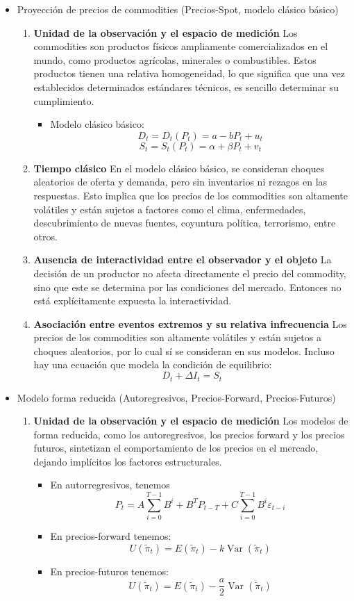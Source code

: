 \begin{problema}
\begin{sol}
\begin{itemize}
\item Proyección de precios de commodities (Precios-Spot, modelo clásico básico) 
\begin{enumerate}
\item \textbf{Unidad de la observación y el espacio de medición}
Los commodities son productos físicos ampliamente comercializados en el mundo, como productos agrícolas, minerales o combustibles. Estos productos tienen una relativa homogeneidad, lo que significa que una vez establecidos determinados estándares técnicos, es sencillo determinar su cumplimiento.
\begin{itemize}
    \item Modelo clásico básico:
    $$D_t=D_t(P_t)=a-bP_t+u_t$$
    $$S_t=S_t(P_t)=\alpha +\beta P_t +v_t$$
\end{itemize}
\item \textbf{Tiempo clásico}
En el modelo clásico básico, se consideran choques aleatorios de oferta y demanda, pero sin inventarios ni rezagos en las respuestas. Esto implica que los precios de los commodities son altamente volátiles y están sujetos a factores como el clima, enfermedades, descubrimiento de nuevas fuentes, coyuntura política, terrorismo, entre otros. 
\item \textbf{Ausencia de interactividad entre el observador y el objeto}
La decisión de un productor no afecta directamente el precio del commodity, sino que este se determina por las condiciones del mercado. Entonces no está explícitamente expuesta la interactividad. 
\item \textbf{Asociación entre eventos extremos y su relativa infrecuencia}
Los precios de los commodities son altamente volátiles y están sujetos a choques aleatorios, por lo cual sí se consideran en sus modelos. Incluso hay una ecuación que modela la condición de equilibrio: 
$$D_t+\Delta I_t=S_t$$
\end{enumerate}


\item Modelo forma reducida (Autoregresivos, Precios-Forward, Precios-Futuros)
\begin{enumerate}
\item \textbf{Unidad de la observación y el espacio de medición}
Los modelos de forma reducida, como los autoregresivos, los precios forward y los precios futuros, sintetizan el comportamiento de los precios en el mercado, dejando implícitos los factores estructurales.
\begin{itemize}
    \item En autorregresivos, tenemos $$P_t = A\sum_{i=0}^{T-1} B^i +B^T P_{t-T}+C\sum_{i=0}^{T-1} B^i \varepsilon_{t-i}$$
    \item En precios-forward tenemos: 
    $$U(\tilde{\pi}_t)= E(\tilde{\pi}_t)-k\operatorname{Var}(\tilde{\pi}_t)$$
    \item En precios-futuros tenemos: 
    $$U(\tilde{\pi}_t)= E(\tilde{\pi}_t)-\frac{a}{2}\operatorname{Var}(\tilde{\pi}_t)$$
\end{itemize}


\end{enumerate}
\end{itemize}
\end{sol}
\end{problema}
